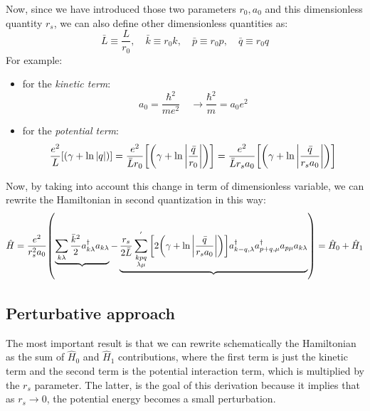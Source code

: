 \documentclass[11pt, a4paper, twoside, openright]{article}
\begin{document}
\begin{itemize}
Now, since we have introduced those two parameters \( r_0,a_0 \) and this dimensionless quantity \( r_s \), we can also define other dimensionless quantities as:
\begin{equation*}
  \bar{L} \equiv \frac{L}{r_0}, \quad \bar{k} \equiv r_0 k, \quad  \bar{p} \equiv r_0 p, \quad \bar{q} \equiv r_0 q
\end{equation*}
For example:
\begin{itemize}
\item for the \emph{kinetic term}:
\begin{equation*}
  a_0 = \frac{\hbar ^2}{m e^2} \quad \rightarrow \frac{\hbar ^2}{m} = a_0 e^2
\end{equation*}
\item for the \emph{potential term}:
\begin{equation*}
  \frac{e^2}{L} \qty[  \qty( \gamma + \ln{\abs{q } }  ) ]  =
  \frac{e^2}{\bar{L}r_0} \qty[  \qty( \gamma + \ln{\abs{ \frac{\bar{q}}{r_0}  } }  ) ] =
  \frac{e^2}{\bar{L}r_s a_0} \qty[  \qty( \gamma + \ln{\abs{ \frac{\bar{q}}{r_s a_0 }  } }  ) ]
\end{equation*}
\end{itemize}
Now, by taking into account this change in term of dimensionless variable, we can
rewrite the Hamiltonian in second quantization in this way:
\begin{equation}
  \hat{H} = \frac{e^2}{r_s^2 a_0} \qty(
  \underbrace{\sum_{k \lambda }^{} \frac{\bar{k}^2}{2} a_{k\lambda }^\dag a_{k\lambda }}_{}
  - \underbrace{\frac{r_s}{2 \bar{L} } \sum_{\substack{k p q \\ \lambda \mu  } }^{'} \qty[  2 \qty( \gamma + \ln{\abs{ \frac{\bar{q}}{r_s a_0 }  } }  ) ]
  a_{k-q, \lambda } ^\dag a_{p+q,\mu }^\dag  a_{p\mu } a_{k \lambda } }_{} ) = \hat{H}_0 + \hat{H}_1
\end{equation}


\subsection*{Perturbative approach}
The most important result is that we can rewrite schematically the Hamiltonian as the sum of \( \hat{H}_0  \)  and \( \hat{H}_1  \) contributions, where the first term is just the kinetic term and the second term is  the potential interaction term, which is multiplied by the \( r_s \) parameter. The latter, is the goal of this derivation because it implies that as \( r_s \rightarrow 0 \), the potential energy becomes a small perturbation.


\end{itemize}
\end{document}
